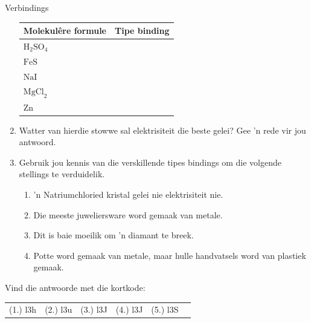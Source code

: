 \begin{exercises}{Verbindings}
\begin{enumerate}[noitemsep, label=\textbf{\arabic*}. ]
          \begin{table}[H]
        \begin{center}
      \label{m38694*id143418}
    \noindent
      \begin{tabular}{|l|l|}\hline
        \textbf{Molekul\^{e}re formule } &
        \textbf{Tipe binding} \\ \hline
        $\text{H}_{2}\text{SO}_{4}$ &
        \\ \hline
        $\text{FeS}$ &
        \\ \hline
        $\text{NaI}$ &
         \\ \hline
        $\text{MgCl}_{2}$ &
        \\ \hline
        $\text{Zn}$ &
       \\ \hline
    \end{tabular}
      \end{center}
\end{table}
    \par
          \label{m38694*uid92}\item Watter van hierdie stowwe sal elektrisiteit die beste gelei? Gee 'n rede vir jou antwoord.
\label{m38694*uid93}\item Gebruik jou kennis van die verskillende tipes bindings om die volgende stellings te verduidelik.
\label{m38694*id143618}\begin{enumerate}[noitemsep, label=\textbf{\alph*}. ] 
            \label{m38694*uid94}\item 'n Natriumchloried kristal gelei nie elektrisiteit nie.
\label{m38694*uid95}\item Die meeste juweliersware word gemaak van metale.
\label{m38694*uid96}\item Dit is baie moeilik om 'n diamant te breek.
\item Potte word gemaak van metale, maar hulle handvatsels word van plastiek gemaak.
\end{enumerate}
                \end{enumerate}
  \label{m38694**end}
\par {} Vind die antwoorde met die kortkode:
 \par \begin{tabular}[h]{cccccc}
 (1.) l3h  &  (2.) l3u  &  (3.) l3J  &  (4.) l3J  &  (5.) l3S  & \end{tabular}
\end{exercises}
